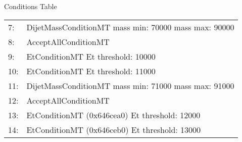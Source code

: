 \documentclass{beamer}
\begin{document}
\begin{frame}[fragile=singleslide]
\begin{minipage}[t]{0.58\linewidth}
\begin{block}{Conditions Table}
\begin{tiny}
\begin{tabular}{ll}
  7: & DijetMassConditionMT mass min: 70000 mass max: 90000 \\
  8: & AcceptAllConditionMT\\
  9: & EtConditionMT Et threshold: 10000 \\
 10: & EtConditionMT Et threshold: 11000 \\
 11: & DijetMassConditionMT mass min: 71000 mass max: 91000\\
 12: & AcceptAllConditionMT\\
 13: & EtConditionMT (0x646cea0)  Et threshold: 12000 \\
 14: & EtConditionMT (0x646ceb0)  Et threshold: 13000 \\
\end{tabular}
\end{tiny}
\end{block}
\end{minipage}
\end{frame}
\end{document}

